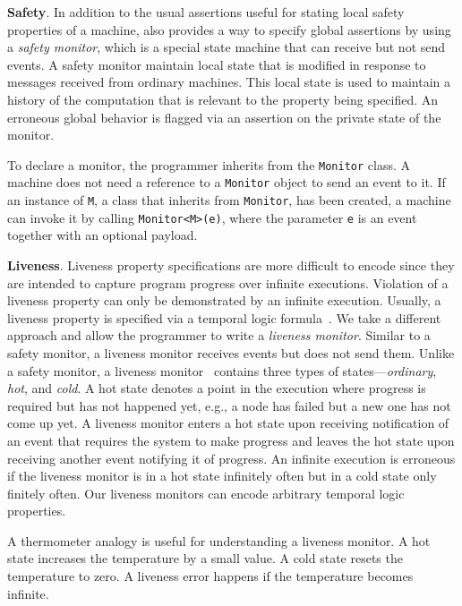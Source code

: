 {\bf Safety}.
In  addition to the usual assertions useful for stating local safety properties of a machine, 
\psharp also provides a way to specify global assertions by using a \emph{safety monitor},
which is a special state machine that can receive but not send events.
A safety monitor maintain local state that is modified in response to messages received from ordinary machines.
This local state is used to maintain a history of the computation that is relevant to the property being specified.
An erroneous global behavior is flagged via an assertion on the private state of the monitor.

To declare a monitor, the programmer inherits from the \psharp \texttt{Monitor} class.
A machine does not need a reference to a \texttt{Monitor} object to send an event to it.
If an instance of \texttt{M}, a class that inherits from \texttt{Monitor}, has been created,
a machine can invoke it by calling \texttt{Monitor<M>(e)},
where the parameter \texttt{e} is an event together with an optional payload.

{\bf Liveness}.
Liveness property specifications are more difficult to encode since they are intended to capture program progress
over infinite executions.
Violation of a liveness property can only be demonstrated by an infinite execution.
Usually, a liveness property is specified via a temporal logic formula~\cite{Pnueli1977,lamport1994temporal}.
We take a different approach and allow the programmer to write a \emph{liveness monitor}.
Similar to a safety monitor, a liveness monitor receives events but does not send them.
Unlike a safety monitor, a liveness monitor~\cite{Desai:EECS-2015-198}
contains three types of states---\emph{ordinary}, \emph{hot}, and \emph{cold}.
A hot state denotes a point in the execution where progress is required but has not happened yet,
e.g., a node has failed but a new one has not come up yet.
A liveness monitor enters a hot state upon receiving notification of an event that requires the system
to make progress and leaves the hot state upon receiving another event notifying it of progress.
An infinite execution is erroneous if the liveness monitor is in a hot state infinitely often but in a cold state only finitely often.
Our liveness monitors can encode arbitrary temporal logic properties.

A thermometer analogy is useful for understanding a liveness monitor.
A hot state increases the temperature by a small value.
A cold state resets the temperature to zero.
A liveness error happens if the temperature becomes infinite.

